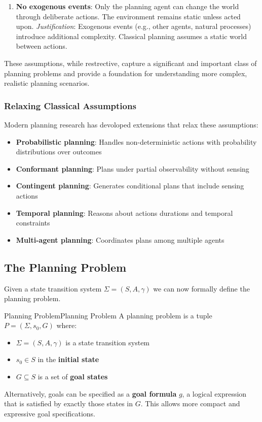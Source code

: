 \documentclass[a4paper]{article}
\theoremstyle{definition}
\begin{document}
\begin{enumerate}
        \newline
        \textit{Justification}: Ignoring action durations simplifies the planning model. Temporal planning
        extends classical planning to handle durations and concurrent actions.
    \item \textbf{No exogenous events}: Only the planning agent can change the world through deliberate actions. 
        The environment remains static unless acted upon.
        \vspace{1em}
        \noindent
        \newline
        \textit{Justification}: Exogenous events (e.g., other agents, natural processes) introduce additional complexity.
        Classical planning assumes a static world between actions.
\end{enumerate}
These assumptions, while restrective, capture a significant and important class of planning problems and provide a foundation
for understanding more complex, realistic planning scenarios.
\subsubsection{Relaxing Classical Assumptions}
Modern planning research has devoloped extensions that relax these assumptions:
\begin{itemize}
    \item \textbf{Probabilistic planning}: Handles non-deterministic actions with probability 
        distributions over outcomes
    \item \textbf{Conformant planning}: Plans under partial observability without sensing 
    \item \textbf{Contingent planning}: Generates conditional plans that include sensing actions 
    \item \textbf{Temporal planning}: Reasons about actions durations and temporal constraints
    \item \textbf{Multi-agent planning}: Coordinates plans among multiple agents
\end{itemize}
\subsection{The Planning Problem}
Given a state transition system \( \Sigma = (S,A,\gamma) \) we can now formally define
the planning problem.
\begin{definition}{Planning Problem}{Planning Problem}
A planning problem is a tuple \( P = (\Sigma, s_0, G) \) where:
\begin{itemize}
    \item \( \Sigma = (S,A,\gamma) \) is a state transition system
    \item \( s_0 \in S \) in the \textbf{initial state}
    \item \( G \subseteq S \) is a set of \textbf{goal states}
\end{itemize}
\end{definition}
Alternatively, goals can be specified as a \textbf{goal formula} \( g \), a logical 
expression that is satisfied by exactly those states in \( G \). This allows more compact and expressive goal 
specifications.
\end{document}
